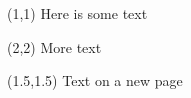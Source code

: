 \documentclass{article}
\begin{document}
  \begin{textblock}{2}(1,1)
    Here is some text
  \end{textblock}

  \begin{textblock}{2}(2,2)
    More text
  \end{textblock}

\null\newpage

\begin{textblock}{2}(1.5,1.5)
  Text on a new page
\end{textblock}
\end{document}
